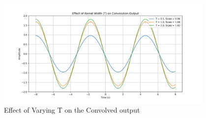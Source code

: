 \begin{figure}[!ht]
    \begin{center}
        \includegraphics[width=0.95\textwidth]{codes/codes_sin_3_and_smoothening/figs/varying_T_effect.png}
    \end{center}
    \caption{Effect of Varying T on the Convolved output}
\end{figure}
\FloatBarrier
